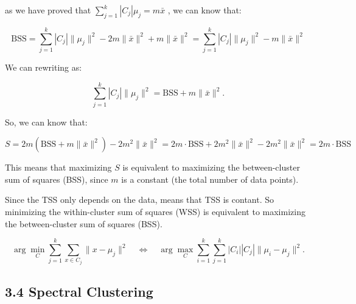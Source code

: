 \documentclass[12pt]{article}
\begin{document}
as we have proved that \( \sum_{j=1}^k |C_j| \mu_j = m \bar{x} \) , we can know that:

\[
    \text{BSS} = \sum_{j=1}^k |C_j| \| \mu_j \|^2 - 2 m \| \bar{x} \|^2 + m \| \bar{x} \|^2 = \sum_{j=1}^k |C_j| \| \mu_j \|^2 - m \| \bar{x} \|^2
\]

We can rewriting as:

\[
\sum_{j=1}^k |C_j| \| \mu_j \|^2 = \text{BSS} + m \| \bar{x} \|^2.
\]

So, we can know that:

\[
    S = 2 m \left( \text{BSS} + m \| \bar{x} \|^2 \right) - 2 m^2 \| \bar{x} \|^2 = 2 m \cdot \text{BSS} + 2 m^2 \| \bar{x} \|^2 - 2 m^2 \| \bar{x} \|^2 = 2 m \cdot \text{BSS}
\]

This means that maximizing \( S \) is equivalent to maximizing the between-cluster sum of squares (BSS), since \( m \) is a constant (the total number of data points).

Since the TSS only depends on the data, means that TSS is contant.
So minimizing the within-cluster sum of squares (WSS) is equivalent to maximizing the between-cluster sum of squares (BSS).

\[
\arg \min_C \sum_{j=1}^k \sum_{x \in C_j} \| x - \mu_j \|^2 \quad \Longleftrightarrow \quad \arg \max_C \sum_{i=1}^k \sum_{j=1}^k |C_i| |C_j| \| \mu_i - \mu_j \|^2.
\]

\subsection*{3.4 Spectral Clustering}
\end{document}
